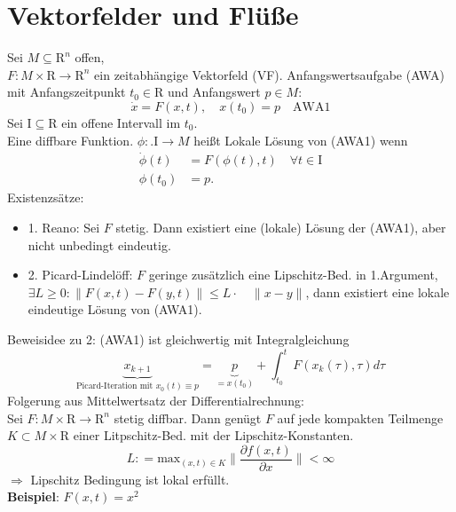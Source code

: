 \documentclass[ngerman]{tudscrreprt}
\begin{document}
\section{Vektorfelder und Flüße}
Sei $M \subseteq \mathrm{R}^n$ offen,\\
$F: M \times \mathrm{R} \to \mathrm{R}^n$ ein zeitabhängige Vektorfeld (VF). Anfangswertsaufgabe (AWA) mit Anfangszeitpunkt $t_0\in \mathrm{R}$ und Anfangswert $p \in M:$ \begin{equation*}
\dot x = F(x,t), \quad x(t_0) = p \quad \text{AWA1}
\end{equation*} 
Sei $\mathrm{I} \subseteq \mathrm{R}$ ein offene Intervall im $t_0$. \\ 
Eine diffbare Funktion. $\phi: . \mathrm{I} \to M$ heißt Lokale Lösung von (AWA1) wenn \begin{equation*}
\begin{split}
\dot \phi(t) &=F(\phi(t),t) \quad \forall t\in \mathrm{I}\\ 
\phi(t_0) &= p.
\end{split}
\end{equation*}
Existenzsätze: \begin{itemize}
\item 1. Reano: Sei $F$ stetig. Dann existiert eine (lokale) Lösung der (AWA1), aber nicht unbedingt eindeutig. 
\item 2. Picard-Lindelöff: $F$ geringe zusätzlich eine Lipschitz-Bed. in 1.Argument,
$\exists L \ge 0: \|F(x,t) - F(y,t)\| \le L\cdot \quad \|x-y\| $, 
dann existiert eine lokale eindeutige Lösung von (AWA1).
\end{itemize}
Beweisidee zu 2: (AWA1) ist gleichwertig mit Integralgleichung 
\begin{equation*}
\underbrace{x_{k+1}}_{\text{Picard-Iteration mit $x_0(t)\equiv p$}} = \underbrace{p}_{=x(t_0)} + \int_{t_0}^{t} F(x_k (\tau),\tau)d\tau
\end{equation*}
Folgerung aus Mittelwertsatz der Differentialrechnung: \\ 
Sei $F: M\times \mathrm{R} \to \mathrm{R}^n$ stetig diffbar. Dann genügt $F$ auf jede kompakten Teilmenge $K \subset M\times \mathrm{R}$ einer Litpschitz-Bed. mit der Lipschitz-Konstanten. 
\begin{equation*}
L: = \text{max}_{(x,t)\in K} \| \frac{\partial f(x,t)}{\partial x} \| < \infty
\end{equation*} 
$\Rightarrow$ Lipschitz Bedingung ist lokal erfüllt.\\
\textbf{Beispiel}: $F(x,t)  = x^2$\\ 
\end{document}
